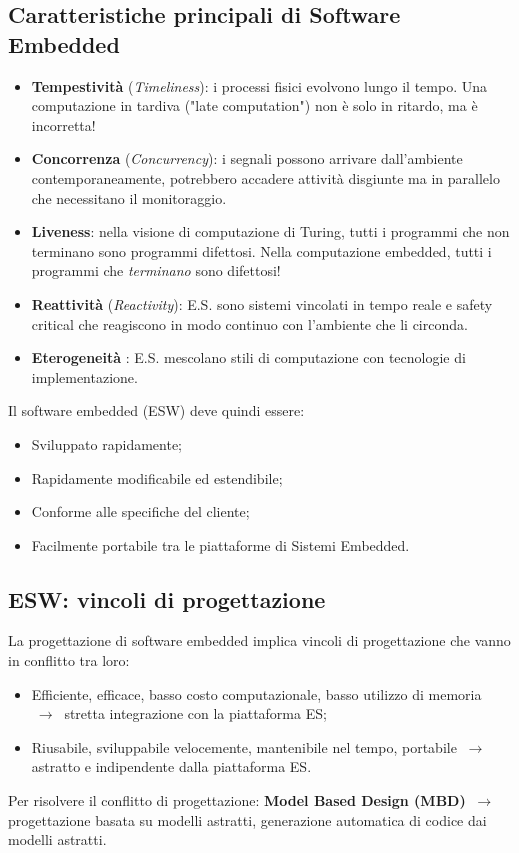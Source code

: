 \documentclass[a4paper]{article}
\theoremstyle{definition}
\begin{document}
		\subsection{Caratteristiche principali di Software Embedded}
			\begin{itemize}
				\item \textbf{Tempestività} (\textit{Timeliness}): i processi fisici evolvono lungo il tempo. Una computazione in tardiva ("late computation") non è solo in ritardo, ma è incorretta!
				\item \textbf{Concorrenza} (\textit{Concurrency}): i segnali possono arrivare dall'ambiente contemporaneamente, potrebbero accadere attività disgiunte ma in parallelo che necessitano il monitoraggio.
				\item \textbf{Liveness}: nella visione di computazione di Turing, tutti i programmi che non terminano sono programmi difettosi. Nella computazione embedded, tutti i programmi che \textit{terminano} sono difettosi!
				\item \textbf{Reattività} (\textit{Reactivity}): E.S. sono sistemi vincolati in tempo reale e safety critical che reagiscono in modo continuo con l'ambiente che li circonda.
				\item \textbf{Eterogeneità} : E.S. mescolano stili di computazione con tecnologie di implementazione.
			\end{itemize}
			
			Il software embedded (ESW) deve quindi essere:
			\begin{itemize}
				\item Sviluppato rapidamente;
				\item Rapidamente modificabile ed estendibile;
				\item Conforme alle specifiche del cliente;
				\item Facilmente portabile tra le piattaforme di Sistemi Embedded.
			\end{itemize} 
		
		\subsection{ESW: vincoli di progettazione}
			La progettazione di software embedded implica vincoli di progettazione che vanno in conflitto tra loro:
			\begin{itemize}
				\item Efficiente, efficace, basso costo computazionale, basso utilizzo di memoria $\ \rightarrow\ $ stretta integrazione con la piattaforma ES;
				\item Riusabile, sviluppabile velocemente, mantenibile nel tempo, portabile  $\ \rightarrow\ $ astratto e indipendente dalla piattaforma ES.
			\end{itemize}
			 Per risolvere il conflitto di progettazione:
			 \textbf{Model Based Design (MBD)}  $\ \rightarrow\ $ progettazione basata su modelli astratti, generazione automatica di codice dai modelli astratti.
		
\end{document}
